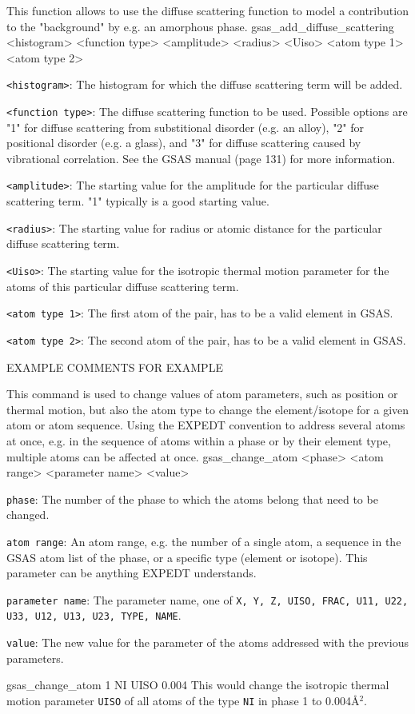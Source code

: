 {
This function allows to use the diffuse scattering function to model a contribution to the "background" by e.g. an amorphous phase.
}{
gsas\_add\_diffuse\_scattering <histogram> <function type> <amplitude> <radius> <Uiso> <atom type 1> <atom type 2> 
}{
\item \texttt{<histogram>}: The histogram for which the diffuse scattering term will be added.
\item \texttt{<function type>}: The diffuse scattering function to be used. Possible options are "1" for diffuse scattering from substitional disorder (e.g. an alloy), "2" for positional disorder (e.g. a glass), and "3" for diffuse scattering caused by vibrational correlation. See the GSAS manual (page 131) for more information.
\item \texttt{<amplitude>}: The starting value for the amplitude for the particular diffuse scattering term. "1" typically is a good starting value.
\item \texttt{<radius>}: The starting value for radius or atomic distance for the particular diffuse scattering term.
\item \texttt{<Uiso>}: The starting value for the isotropic thermal motion parameter for the atoms of this particular diffuse scattering term.
\item \texttt{<atom type 1>}: The first atom of the pair, has to be a valid element in GSAS.
\item \texttt{<atom type 2>}: The second atom of the pair, has to be a valid element in GSAS.
}{
EXAMPLE
}{
COMMENTS FOR EXAMPLE
}

{
This command is used to change values of atom parameters, such as position or thermal motion, but also the atom type to change the element/isotope for a given atom or atom sequence. Using the EXPEDT convention to address several atoms at once, e.g. in the sequence of atoms within a phase or by their element type, multiple atoms can be affected at once.
}{
gsas\_change\_atom <phase> <atom range> <parameter name> <value>
}{
\item \texttt{phase}: The number of the phase to which the atoms belong that need to be changed.
\item \texttt{atom range}: An atom range, e.g. the number of a single atom, a sequence in the GSAS atom list of the phase, or a specific type (element or isotope). This parameter can be anything EXPEDT understands.
\item \texttt{parameter name}: The parameter name, one of \texttt{X, Y, Z, UISO, FRAC, U11, U22, U33, U12, U13, U23, TYPE, NAME}.
\item \texttt{value}: The new value for the parameter of the atoms addressed with the previous parameters. 
}{
gsas\_change\_atom 1 NI UISO 0.004
}{
This would change the isotropic thermal motion parameter \texttt{UISO} of all atoms of the type \texttt{NI} in phase 1 to 0.004\AA$^2$.
}


